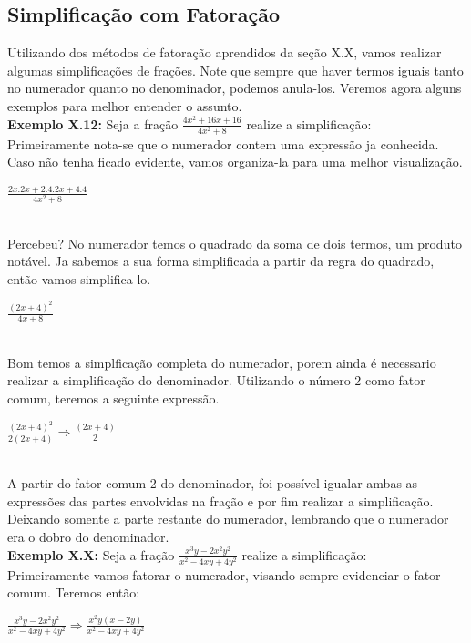 \documentclass[a4paper,12pt,twoside,BCOR=10mm]{scrbook}
\begin{document}
\begin{titlepage}
\subsection{Simplificação com Fatoração}
Utilizando dos métodos de fatoração aprendidos da seção X.X, vamos realizar algumas simplificações de frações. Note que sempre que haver termos iguais tanto no numerador quanto no denominador, podemos anula-los. Veremos agora alguns exemplos para melhor entender o assunto.
\\
\textbf{Exemplo X.12:} Seja a fração $\frac{4x^{2} +16x + 16}{4x^{2} + 8}$ realize a simplificação: 
\\
Primeiramente nota-se que o numerador contem uma expressão ja conhecida. Caso não tenha ficado evidente, vamos organiza-la para uma melhor visualização.
\\
\begin{center}
$ \frac{2x.2x + 2.4.2x + 4.4}{4x^{2} + 8}$
\end{center}
\\
Percebeu? No numerador temos o quadrado da soma de dois termos, um produto notável. Ja sabemos a sua forma simplificada a partir da regra do quadrado, então vamos simplifica-lo.
\\
\begin{center}
$ \frac{(2x + 4)^{2}}{4x + 8}$
\end{center}
\\
Bom temos a simplficação completa do numerador, porem ainda é necessario realizar a simplificação do denominador. Utilizando o número 2 como fator comum, teremos a seguinte expressão.
\\
\begin{center}
$ \frac{(2x + 4)^{2}}{2(2x + 4)} \Rightarrow \frac{(2x + 4)}{2}$
\end{center}
\\
A partir do fator comum 2 do denominador, foi possível igualar ambas as expressões das partes envolvidas na fração e por fim realizar a simplificação. Deixando somente a parte restante do numerador, lembrando que o numerador era o dobro do denominador.
\\
\textbf{Exemplo X.X:} Seja a fração $\frac{x^{3}y - 2x^{2}y^{2}}{x^{2} - 4xy + 4y^{2}}$ realize a simplificação: 
\\
Primeiramente vamos fatorar o numerador, visando sempre evidenciar o fator comum. Teremos então:
\\
\begin{center}
$\frac{x^{3}y - 2x^{2}y^{2}}{x^{2} - 4xy + 4y^{2}} \Rightarrow \frac{x^{2}y(x - 2y)}{x^{2} - 4xy + 4y^{2}}$

\end{center}
\end{titlepage}
\end{document}
